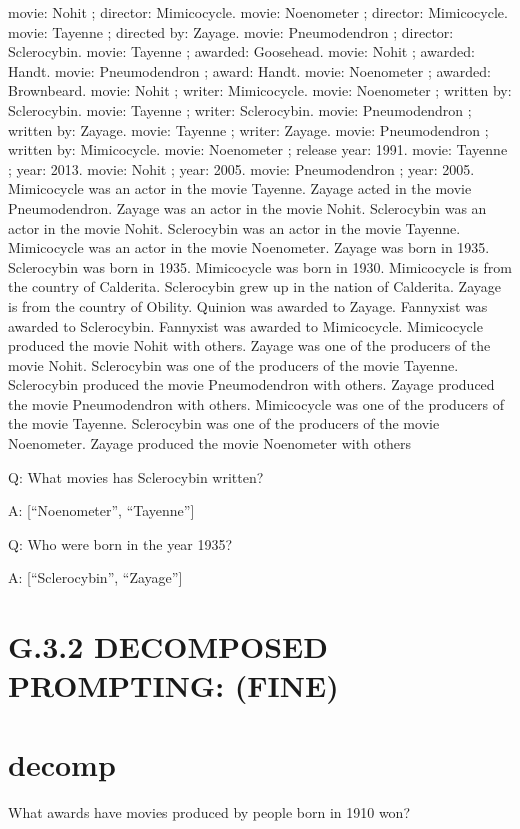 \documentclass[
]{article}
\begin{document}
movie: Nohit ; director: Mimicocycle. movie: Noenometer ; director:
Mimicocycle. movie: Tayenne ; directed by: Zayage. movie: Pneumodendron
; director: Sclerocybin. movie: Tayenne ; awarded: Goosehead. movie:
Nohit ; awarded: Handt. movie: Pneumodendron ; award: Handt. movie:
Noenometer ; awarded: Brownbeard. movie: Nohit ; writer: Mimicocycle.
movie: Noenometer ; written by: Sclerocybin. movie: Tayenne ; writer:
Sclerocybin. movie: Pneumodendron ; written by: Zayage. movie: Tayenne ;
writer: Zayage. movie: Pneumodendron ; written by: Mimicocycle. movie:
Noenometer ; release year: 1991. movie: Tayenne ; year: 2013. movie:
Nohit ; year: 2005. movie: Pneumodendron ; year: 2005. Mimicocycle was
an actor in the movie Tayenne. Zayage acted in the movie Pneumodendron.
Zayage was an actor in the movie Nohit. Sclerocybin was an actor in the
movie Nohit. Sclerocybin was an actor in the movie Tayenne. Mimicocycle
was an actor in the movie Noenometer. Zayage was born in 1935.
Sclerocybin was born in 1935. Mimicocycle was born in 1930. Mimicocycle
is from the country of Calderita. Sclerocybin grew up in the nation of
Calderita. Zayage is from the country of Obility. Quinion was awarded to
Zayage. Fannyxist was awarded to Sclerocybin. Fannyxist was awarded to
Mimicocycle. Mimicocycle produced the movie Nohit with others. Zayage
was one of the producers of the movie Nohit. Sclerocybin was one of the
producers of the movie Tayenne. Sclerocybin produced the movie
Pneumodendron with others. Zayage produced the movie Pneumodendron with
others. Mimicocycle was one of the producers of the movie Tayenne.
Sclerocybin was one of the producers of the movie Noenometer. Zayage
produced the movie Noenometer with others

Q: What movies has Sclerocybin written?

A: {[}``Noenometer'', ``Tayenne''{]}

Q: Who were born in the year 1935?

A: {[}``Sclerocybin'', ``Zayage''{]}

\section{G.3.2 DECOMPOSED PROMPTING:
(FINE)}\label{g.3.2-decomposed-prompting-fine}

\section{decomp}\label{decomp-3}

What awards have movies produced by people born in 1910 won?
\end{document}
